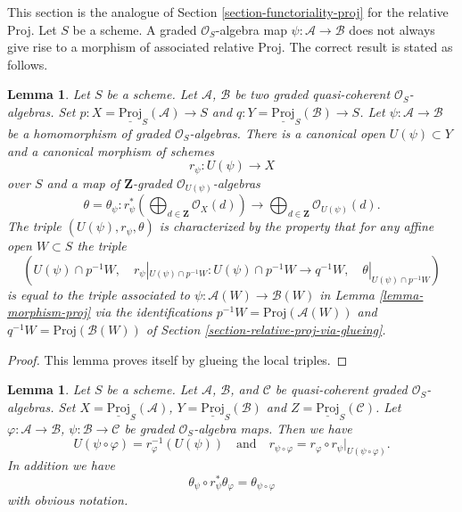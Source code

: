 \documentclass{stacks-project}
\theoremstyle{plain}
\newtheorem{lemma}[subsection]{Lemma}
\theoremstyle{definition}
\theoremstyle{remark}
\numberwithin{equation}{subsection}
\begin{document}
\noindent
This section is the analogue of Section \ref{section-functoriality-proj}
for the relative Proj. Let $S$ be a scheme. A graded $\mathcal{O}_S$-algebra
map $\psi : \mathcal{A} \to \mathcal{B}$ does not always give rise to a
morphism of associated relative Proj. The correct result is stated as follows.

\begin{lemma}
\label{lemma-morphism-relative-proj}
Let $S$ be a scheme. Let $\mathcal{A}$, $\mathcal{B}$ be two graded
quasi-coherent $\mathcal{O}_S$-algebras. Set
$p : X = \underline{\text{Proj}}_S(\mathcal{A}) \to S$ and
$q : Y = \underline{\text{Proj}}_S(\mathcal{B}) \to S$. Let
$\psi : \mathcal{A} \to \mathcal{B}$ be a homomorphism of
graded $\mathcal{O}_S$-algebras. There is a canonical open
$U(\psi) \subset Y$ and a canonical morphism of schemes
$$
r_\psi :
U(\psi)
\longrightarrow
X
$$
over $S$ and a map of $\mathbf{Z}$-graded $\mathcal{O}_{U(\psi)}$-algebras
$$
\theta = \theta_\psi :
r_\psi^*\left(
\bigoplus\nolimits_{d \in \mathbf{Z}} \mathcal{O}_X(d)
\right)
\longrightarrow
\bigoplus\nolimits_{d \in \mathbf{Z}} \mathcal{O}_{U(\psi)}(d).
$$
The triple $(U(\psi), r_\psi, \theta)$ is characterized by the property
that for any affine open $W \subset S$ the triple
$$
(U(\psi) \cap p^{-1}W,\quad
r_\psi|_{U(\psi) \cap p^{-1}W} : U(\psi) \cap p^{-1}W \to q^{-1}W,\quad
\theta|_{U(\psi) \cap p^{-1}W})
$$
is equal to the triple associated to
$\psi : \mathcal{A}(W) \to \mathcal{B}(W)$ in
Lemma \ref{lemma-morphism-proj} via the identifications
$p^{-1}W = \text{Proj}(\mathcal{A}(W))$ and
$q^{-1}W = \text{Proj}(\mathcal{B}(W))$ of
Section \ref{section-relative-proj-via-glueing}.
\end{lemma}

\begin{proof}
This lemma proves itself by glueing the local triples.
\end{proof}

\begin{lemma}
\label{lemma-morphism-relative-proj-transitive}
Let $S$ be a scheme. Let $\mathcal{A}$, $\mathcal{B}$, and $\mathcal{C}$ be
quasi-coherent graded $\mathcal{O}_S$-algebras.
Set $X = \underline{\text{Proj}}_S(\mathcal{A})$,
$Y = \underline{\text{Proj}}_S(\mathcal{B})$ and
$Z = \underline{\text{Proj}}_S(\mathcal{C})$.
Let $\varphi : \mathcal{A} \to \mathcal{B}$,
$\psi : \mathcal{B} \to \mathcal{C}$ be graded $\mathcal{O}_S$-algebra maps.
Then we have
$$
U(\psi \circ \varphi) = r_\varphi^{-1}(U(\psi))
\quad
\text{and}
\quad
r_{\psi \circ \varphi}
=
r_\varphi \circ r_\psi|_{U(\psi \circ \varphi)}.
$$
In addition we have
$$
\theta_\psi \circ r_\psi^*\theta_\varphi
=
\theta_{\psi \circ \varphi}
$$
with obvious notation.
\end{lemma}
\end{document}
